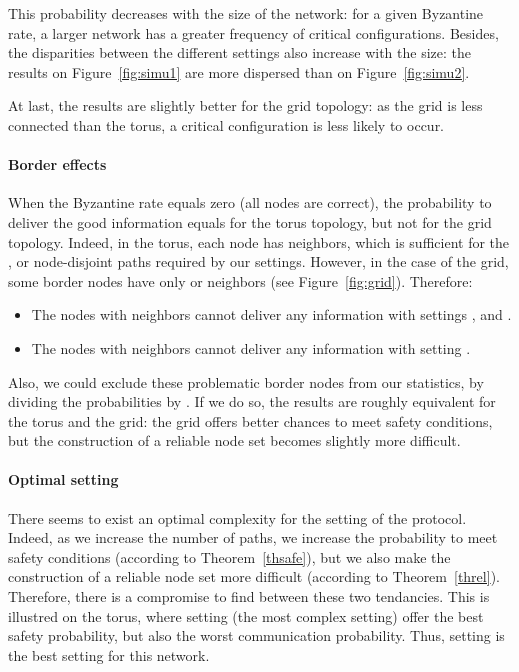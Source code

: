 \documentclass[a4paper,11pt]{article}
\begin{document}
This probability decreases with the size of the network: for a given Byzantine rate, a larger network has a greater frequency of critical configurations. Besides, the disparities between the different settings also increase with the size: the results on Figure~\ref{fig:simu1} are more dispersed than on Figure~\ref{fig:simu2}.

At last, the results are slightly better for the grid topology: as the grid is less connected than the torus, a critical configuration is less likely to occur.

\paragraph{Border effects}

When the Byzantine rate equals zero (all nodes are correct), the probability to deliver the good information equals  for the torus topology, but not for the grid topology. Indeed, in the torus, each node has  neighbors, which is sufficient for the ,  or  node-disjoint paths required by our settings. However, in the case of the grid, some border nodes have only  or  neighbors (see Figure~\ref{fig:grid}). Therefore:
\begin{itemize}
\item The nodes with  neighbors cannot deliver any information with settings ,  and .
\item The nodes with  neighbors cannot deliver any information with setting .
\end{itemize}
Also, we could exclude these problematic border nodes from our statistics, by dividing the probabilities by . If we do so, the results are roughly equivalent for the torus and the grid: the grid offers better chances to meet safety conditions, but the construction of a reliable node set becomes slightly more difficult.


\paragraph{Optimal setting}

There seems to exist an optimal complexity for the setting of the protocol.
Indeed, as we increase the number of paths, we increase the probability to meet safety conditions (according to Theorem~\ref{thsafe}), but we also make the construction of a reliable node set more difficult (according to Theorem~\ref{threl}). Therefore, there is a compromise to find between these two tendancies. This is illustred on the  torus, where setting  (the most complex setting) offer the best safety probability, but also the worst communication probability.
Thus, setting  is the best setting for this network.
\end{document}
